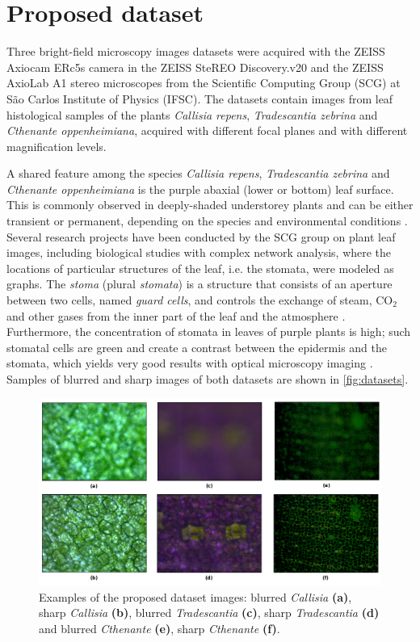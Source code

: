 \section{Proposed dataset}

Three bright-field microscopy images datasets were acquired with the ZEISS Axiocam ERc5s camera in the ZEISS SteREO Discovery.v20 and the ZEISS AxioLab A1 stereo microscopes from the Scientific Computing Group (SCG) at São Carlos Institute of Physics (IFSC). The datasets contain images from leaf histological samples of the plants \textit{Callisia repens}, \textit{Tradescantia zebrina} and \textit{Cthenante oppenheimiana}, acquired with different focal planes and with different magnification levels. 

A shared feature among the species \textit{Callisia repens}, \textit{Tradescantia zebrina} and \textit{Cthenante oppenheimiana} is the purple abaxial (lower or bottom) leaf surface. This is commonly observed in deeply-shaded understorey plants and can be either transient or permanent, depending on the species and environmental conditions \cite{filho2018plants}. Several research projects have been conducted by the SCG group on plant leaf images, including biological studies with complex network analysis, where the locations of particular structures of the leaf, i.e. the stomata, were modeled as graphs. The \emph{stoma} (plural \emph{stomata}) is a structure that consists of an aperture between two cells, named \emph{guard cells}, and controls the exchange of steam, CO$_{2}$ and other gases from the inner part of the leaf and the atmosphere  \cite{hetherington2003role}. Furthermore, the concentration of stomata in leaves of purple plants is high; such stomatal cells are green and create a contrast between the epidermis and the stomata, which yields very good results with optical microscopy imaging \cite{filho2018plants}. Samples of blurred and sharp images of both datasets are shown in \autoref{fig:datasets}.

\begin{figure}[ht]
	\centering
	\caption{Examples of the proposed dataset images: blurred \textit{Callisia} \textbf{(a)}, sharp \textit{Callisia} \textbf{(b)}, blurred \textit{Tradescantia} \textbf{(c)}, sharp \textit{Tradescantia} \textbf{(d)} and blurred \textit{Cthenante} \textbf{(e)}, sharp \textit{Cthenante} \textbf{(f)}.}
	\label{fig:datasets}
	\includegraphics[scale=0.4]{images/datasets.png}
	\centering
	\fautor
\end{figure}

